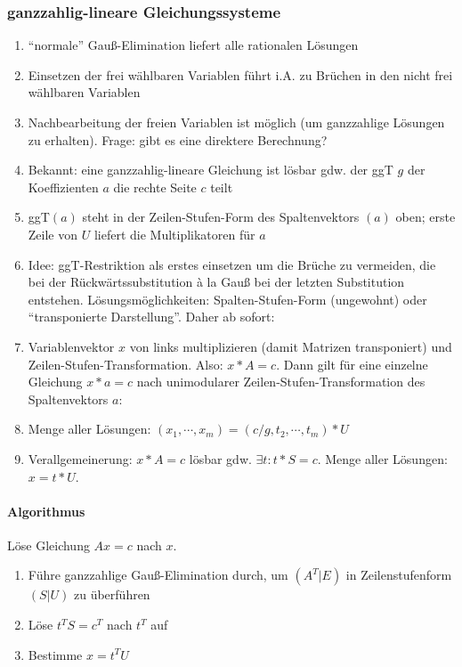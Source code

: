 \subsubsection{ganzzahlig-lineare Gleichungssysteme}
\begin{enumerate}
	\item ``normale'' Gauß-Elimination liefert alle rationalen Lösungen
	\item Einsetzen der frei wählbaren Variablen führt i.A. zu Brüchen in den nicht frei wählbaren Variablen
	\item Nachbearbeitung der freien Variablen ist möglich (um ganzzahlige Lösungen zu erhalten).
		Frage: gibt es eine direktere Berechnung?
	\item Bekannt: eine ganzzahlig-lineare Gleichung ist lösbar gdw. der ggT $g$ der Koeffizienten $a$ die rechte Seite $c$ teilt
	\item ggT$(a)$ steht in der Zeilen-Stufen-Form des Spaltenvektors $(a)$ oben; erste Zeile von $U$ liefert die Multiplikatoren für $a$
	\item Idee: ggT-Restriktion als erstes einsetzen um die Brüche zu vermeiden,
		die bei der Rückwärtssubstitution \`a la Gauß bei der letzten Substitution entstehen.
		Lösungsmöglichkeiten: Spalten-Stufen-Form (ungewohnt) oder ``transponierte Darstellung''.
		Daher ab sofort:
	\item Variablenvektor $x$ von links multiplizieren (damit Matrizen transponiert) und Zeilen-Stufen-Transformation.
		Also: $x*A = c$. Dann gilt für eine einzelne Gleichung $x*a=c$ nach unimodularer Zeilen-Stufen-Transformation des Spaltenvektors $a$:
	\item Menge aller Lösungen: $(x_1,\cdots,x_m) = (c/g,t_2,\cdots,t_m)* U$
	\item Verallgemeinerung: $x*A = c$ lösbar gdw. $\exists t: t*S = c$. Menge aller Lösungen: $x = t*U$.
\end{enumerate}

\paragraph{Algorithmus}

Löse Gleichung $Ax=c$ nach $x$.\begin{enumerate}
    \item Führe ganzzahlige Gauß-Elimination durch, um $(A^T|E)$ in Zeilenstufenform
        $(S|U)$ zu überführen
    \item Löse $t^TS=c^T$ nach $t^T$ auf
    \item Bestimme $x=t^TU$
\end{enumerate}



